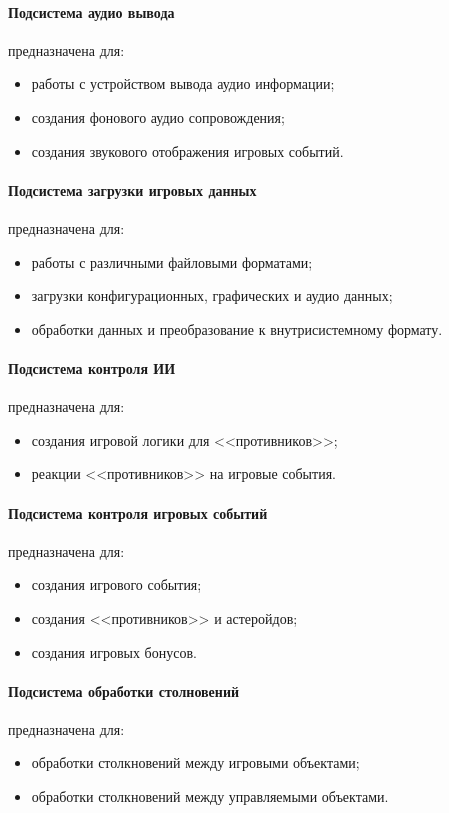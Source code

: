 \paragraph{Подсистема аудио вывода}
предназначена для:
\begin{itemize}
    \item работы с устройством вывода аудио информации;
    \item создания фонового аудио сопровождения;
    \item создания звукового отображения игровых событий.
\end{itemize}

\paragraph{Подсистема загрузки игровых данных}
предназначена для:
\begin{itemize}
    \item работы с различными файловыми форматами;
    \item загрузки конфигурационных, графических и аудио данных;
    \item обработки данных и преобразование к внутрисистемному формату.
\end{itemize}

\paragraph{Подсистема контроля ИИ}
предназначена для:
\begin{itemize}
    \item создания игровой логики для <<противников>>;
    \item реакции <<противников>> на игровые события.
\end{itemize}

\paragraph{Подсистема контроля игровых событий}
предназначена для:
\begin{itemize}
    \item создания игрового события;
    \item создания <<противников>> и астеройдов;
    \item создания игровых бонусов.
\end{itemize}

\paragraph{Подсистема обработки столновений}
предназначена для:
\begin{itemize}
    \item обработки столкновений между игровыми объектами;
    \item обработки столкновений между управляемыми объектами.
\end{itemize}

